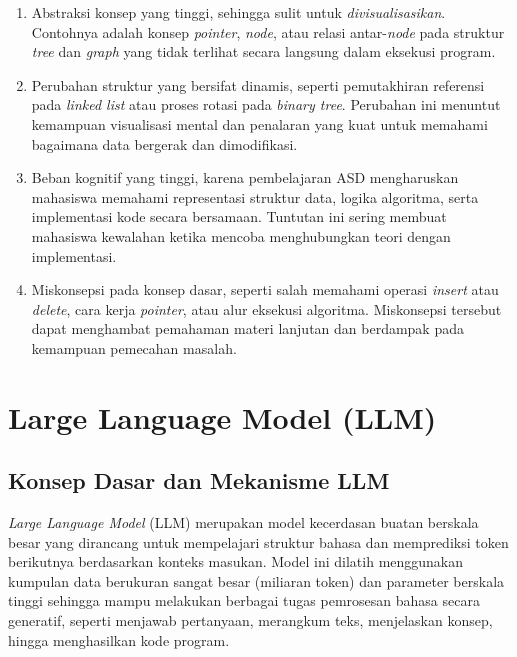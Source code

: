 \begin{enumerate}
    \item Abstraksi konsep yang tinggi, sehingga sulit untuk \textit{divisualisasikan}. Contohnya adalah konsep \textit{pointer}, \textit{node}, atau relasi antar-\textit{node} pada struktur \textit{tree} dan \textit{graph} yang tidak terlihat secara langsung dalam eksekusi program.
    
    \item Perubahan struktur yang bersifat dinamis, seperti pemutakhiran referensi pada \textit{linked list} atau proses rotasi pada \textit{binary tree}. Perubahan ini menuntut kemampuan visualisasi mental dan penalaran yang kuat untuk memahami bagaimana data bergerak dan dimodifikasi.
    
    \item Beban kognitif yang tinggi, karena pembelajaran ASD mengharuskan mahasiswa memahami representasi struktur data, logika algoritma, serta implementasi kode secara bersamaan. Tuntutan ini sering membuat mahasiswa kewalahan ketika mencoba menghubungkan teori dengan implementasi.
    
    \item Miskonsepsi pada konsep dasar, seperti salah memahami operasi \textit{insert} atau \textit{delete}, cara kerja \textit{pointer}, atau alur eksekusi algoritma. Miskonsepsi tersebut dapat menghambat pemahaman materi lanjutan dan berdampak pada kemampuan pemecahan masalah.
\end{enumerate}




\section{Large Language Model (LLM)}

\subsection{Konsep Dasar dan Mekanisme LLM}

\textit{Large Language Model} (LLM) merupakan model kecerdasan buatan berskala besar yang dirancang untuk mempelajari struktur bahasa dan memprediksi token berikutnya berdasarkan konteks masukan. Model ini dilatih menggunakan kumpulan data berukuran sangat besar (miliaran token) dan parameter berskala tinggi sehingga mampu melakukan berbagai tugas pemrosesan bahasa secara generatif, seperti menjawab pertanyaan, merangkum teks, menjelaskan konsep, hingga menghasilkan kode program.

